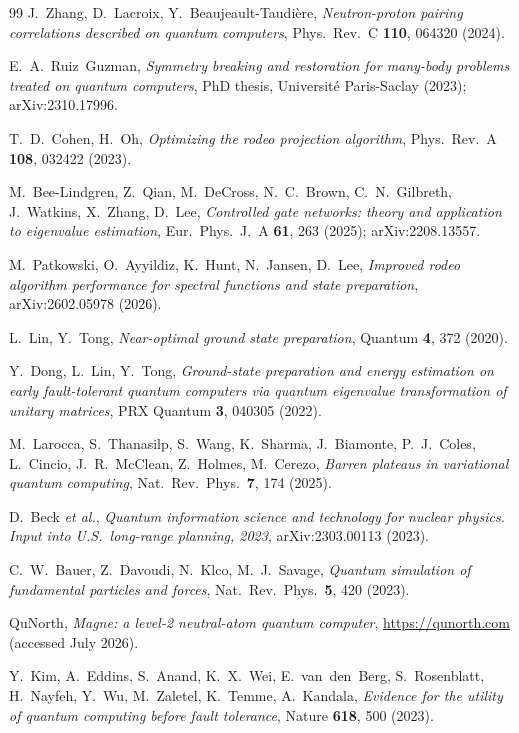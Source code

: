 \documentclass[
  aps,            %
  prc,            %
  reprint,        %
  superscriptaddress,
  floatfix,
  nofootinbib
]{revtex4-2}
\begin{document}
\begin{thebibliography}{99}
J.~Zhang, D.~Lacroix, Y.~Beaujeault-Taudi\`ere,
\textit{Neutron-proton pairing correlations described on quantum computers},
Phys.\ Rev.\ C \textbf{110}, 064320 (2024).

E.~A.~Ruiz~Guzman,
\textit{Symmetry breaking and restoration for many-body problems treated on
quantum computers},
PhD thesis, Universit\'e Paris-Saclay (2023); arXiv:2310.17996.

T.~D.~Cohen, H.~Oh,
\textit{Optimizing the rodeo projection algorithm},
Phys.\ Rev.\ A \textbf{108}, 032422 (2023).

M.~Bee-Lindgren, Z.~Qian, M.~DeCross, N.~C.~Brown, C.~N.~Gilbreth, J.~Watkins,
X.~Zhang, D.~Lee,
\textit{Controlled gate networks: theory and application to eigenvalue estimation},
Eur.\ Phys.\ J.\ A \textbf{61}, 263 (2025); arXiv:2208.13557.

M.~Patkowski, O.~Ayyildiz, K.~Hunt, N.~Jansen, D.~Lee,
\textit{Improved rodeo algorithm performance for spectral functions and state
preparation},
arXiv:2602.05978 (2026).

L.~Lin, Y.~Tong,
\textit{Near-optimal ground state preparation},
Quantum \textbf{4}, 372 (2020).

Y.~Dong, L.~Lin, Y.~Tong,
\textit{Ground-state preparation and energy estimation on early fault-tolerant
quantum computers via quantum eigenvalue transformation of unitary matrices},
PRX Quantum \textbf{3}, 040305 (2022).

M.~Larocca, S.~Thanasilp, S.~Wang, K.~Sharma, J.~Biamonte, P.~J.~Coles,
L.~Cincio, J.~R.~McClean, Z.~Holmes, M.~Cerezo,
\textit{Barren plateaus in variational quantum computing},
Nat.\ Rev.\ Phys.\ \textbf{7}, 174 (2025).

D.~Beck \textit{et al.},
\textit{Quantum information science and technology for nuclear physics.
Input into U.S.\ long-range planning, 2023},
arXiv:2303.00113 (2023).

C.~W.~Bauer, Z.~Davoudi, N.~Klco, M.~J.~Savage,
\textit{Quantum simulation of fundamental particles and forces},
Nat.\ Rev.\ Phys.\ \textbf{5}, 420 (2023).

QuNorth, \textit{Magne: a level-2 neutral-atom quantum computer},
\url{https://qunorth.com} (accessed July 2026).

Y.~Kim, A.~Eddins, S.~Anand, K.~X.~Wei, E.~van~den~Berg, S.~Rosenblatt,
H.~Nayfeh, Y.~Wu, M.~Zaletel, K.~Temme, A.~Kandala,
\textit{Evidence for the utility of quantum computing before fault tolerance},
Nature \textbf{618}, 500 (2023).


\end{thebibliography}
\end{document}

